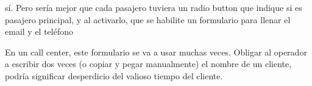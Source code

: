 sí. Pero sería mejor que cada pasajero tuviera un radio button que indique si es pasajero principal, y al activarlo, que se habilite un formulario para llenar el email y el teléfono

En un call center, este formulario se va a usar muchas veces. Obligar al operador a escribir dos veces (o copiar y pegar manualmente) el nombre de un cliente, podría significar desperdicio del valioso tiempo del cliente.
